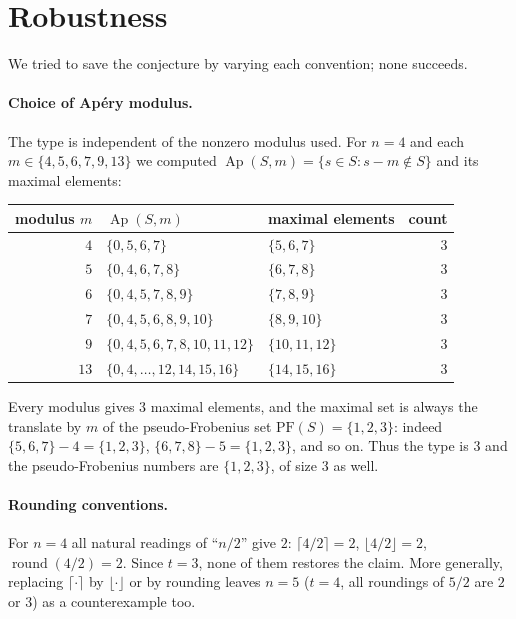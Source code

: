 \documentclass[11pt]{article}
\theoremstyle{definition}
\theoremstyle{remark}
\newcommand{\Ap}{\operatorname{Ap}}
\begin{document}
\section{Robustness}\label{sec:robust}

We tried to save the conjecture by varying each convention; none succeeds.

\paragraph{Choice of Apéry modulus.} The type is independent of the nonzero
modulus used. For $n = 4$ and each $m \in \{4,5,6,7,9,13\}$ we computed
$\Ap(S,m) = \{s \in S : s - m \notin S\}$ and its maximal elements:

\begin{center}
\begin{tabular}{r l l r}
\toprule
modulus $m$ & $\Ap(S,m)$ & maximal elements & count \\
\midrule
$4$  & $\{0,5,6,7\}$                   & $\{5,6,7\}$   & $3$ \\
$5$  & $\{0,4,6,7,8\}$                 & $\{6,7,8\}$   & $3$ \\
$6$  & $\{0,4,5,7,8,9\}$               & $\{7,8,9\}$   & $3$ \\
$7$  & $\{0,4,5,6,8,9,10\}$            & $\{8,9,10\}$  & $3$ \\
$9$  & $\{0,4,5,6,7,8,10,11,12\}$      & $\{10,11,12\}$& $3$ \\
$13$ & $\{0,4,\dots,12,14,15,16\}$     & $\{14,15,16\}$& $3$ \\
\bottomrule
\end{tabular}
\end{center}

Every modulus gives $3$ maximal elements, and the maximal set is always the
translate by $m$ of the pseudo-Frobenius set
$\mathrm{PF}(S) = \{1,2,3\}$: indeed $\{5,6,7\} - 4 = \{1,2,3\}$,
$\{6,7,8\} - 5 = \{1,2,3\}$, and so on. Thus the type is $3$ and the
pseudo-Frobenius numbers are $\{1,2,3\}$, of size $3$ as well.

\paragraph{Rounding conventions.} For $n = 4$ all natural readings of
``$n/2$'' give $2$: $\lceil 4/2 \rceil = 2$, $\lfloor 4/2 \rfloor = 2$,
$\operatorname{round}(4/2) = 2$. Since $t = 3$, none of them restores the
claim. More generally, replacing $\lceil \cdot \rceil$ by $\lfloor \cdot
\rfloor$ or by rounding leaves $n = 5$ ($t = 4$, all roundings of $5/2$ are
$2$ or $3$) as a counterexample too.
\end{document}

